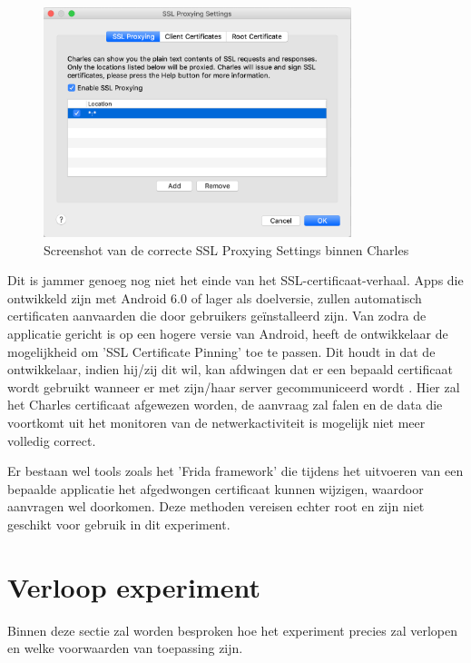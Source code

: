 \begin{figure}
    \centering
    \includegraphics[width=0.8\textwidth]{img/charlessslsettings.png}
    \caption{Screenshot van de correcte SSL Proxying Settings binnen Charles}
    \label{fig:charlessslsettings}
\end{figure}

Dit is jammer genoeg nog niet het einde van het SSL-certificaat-verhaal. Apps die ontwikkeld zijn met Android 6.0 of lager als doelversie, zullen automatisch certificaten aanvaarden die door gebruikers geïnstalleerd zijn. Van zodra de applicatie gericht is op een hogere versie van Android, heeft de ontwikkelaar de mogelijkheid om 'SSL Certificate Pinning' toe te passen. Dit houdt in dat de ontwikkelaar, indien hij/zij dit wil, kan afdwingen dat er een bepaald certificaat wordt gebruikt wanneer er met zijn/haar server gecommuniceerd wordt \autocite{wass_ssl-pinning}. Hier zal het Charles certificaat afgewezen worden, de aanvraag zal falen en de data die voortkomt uit het monitoren van de netwerkactiviteit is mogelijk niet meer volledig correct.

Er bestaan wel tools zoals het 'Frida framework' die tijdens het uitvoeren van een bepaalde applicatie het afgedwongen certificaat kunnen wijzigen, waardoor aanvragen wel doorkomen. Deze methoden vereisen echter root en zijn niet geschikt voor gebruik in dit experiment.


\section{Verloop experiment}
\label{sec:conditionsexperiment}
Binnen deze sectie zal worden besproken hoe het experiment precies zal verlopen en welke voorwaarden van toepassing zijn.

